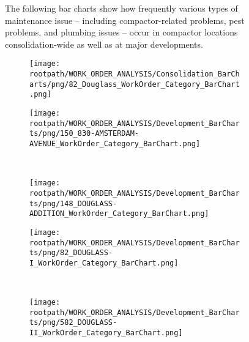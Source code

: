 \begin{figure}[h]
                                \sf
                                The following bar charts show how frequently various types of maintenance issue -- including compactor-related problems, pest problems, and plumbing issues -- occur in compactor locations consolidation-wide as well as at major developments.
                                \raggedright
                                \begin{subfigure}{\textwidth}
                                \texttt{[image: \\rootpath/WORK\_ORDER\_ANALYSIS/Consolidation\_BarCharts/png/82\_Douglass\_WorkOrder\_Category\_BarChart.png]}
                                \end{subfigure}
                                
                                        \begin{subfigure}{0.45\textwidth}
                                        \texttt{[image: \\rootpath/WORK\_ORDER\_ANALYSIS/Development\_BarCharts/png/150\_830-AMSTERDAM-AVENUE\_WorkOrder\_Category\_BarChart.png]}
                                        \end{subfigure}
                                        ~
                                        \begin{subfigure}{0.45\textwidth}
                                        \texttt{[image: \\rootpath/WORK\_ORDER\_ANALYSIS/Development\_BarCharts/png/148\_DOUGLASS-ADDITION\_WorkOrder\_Category\_BarChart.png]}
                                        \end{subfigure}
                                        
                                        
                                        \begin{subfigure}{0.45\textwidth}
                                        \texttt{[image: \\rootpath/WORK\_ORDER\_ANALYSIS/Development\_BarCharts/png/82\_DOUGLASS-I\_WorkOrder\_Category\_BarChart.png]}
                                        \end{subfigure}
                                        ~
                                        \begin{subfigure}{0.45\textwidth}
                                        \texttt{[image: \\rootpath/WORK\_ORDER\_ANALYSIS/Development\_BarCharts/png/582\_DOUGLASS-II\_WorkOrder\_Category\_BarChart.png]}
                                        \end{subfigure}
                                        
                                        \end{figure}
